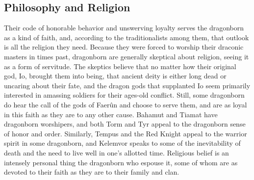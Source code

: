 \documentclass[10pt,a4paper,twoside,twocolumn,openany,bg=print,nodeprecatedcode]{dndbook}
\begin{document}
\subsection{Philosophy and Religion}
Their code of honorable behavior and unswerving loyalty serves the dragonborn as a kind of faith, and, according to the traditionalists among them, that outlook is all the religion they need. Because they were forced to worship their draconic masters in times past, dragonborn are generally skeptical about religion, seeing it as a form of servitude. The skeptics believe that no matter how their original god, Io, brought them into being, that ancient deity is either long dead or uncaring about their fate, and the dragon gods that supplanted Io seem primarily interested in amassing soldiers for their ages-old conflict.
Still, some dragonborn do hear the call of the gods of Faerûn and choose to serve them, and are as loyal in this faith as they are to any other cause. Bahamut and Tiamat have dragonborn worshipers, and both Torm and Tyr appeal to the dragonborn sense of honor and order. Similarly, Tempus and the Red Knight appeal to the warrior spirit in some dragonborn, and Kelemvor speaks to some of the inevitability of death and the need to live well in one's allotted time. Religious belief is an intensely personal thing the dragonborn who espouse it, some of whom are as devoted to their faith as they are to their family and clan.
\end{document}
